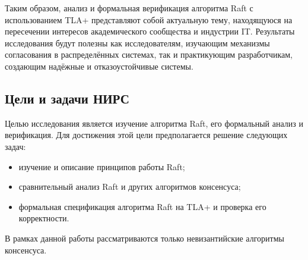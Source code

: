 Таким образом, анализ и формальная верификация алгоритма Raft с использованием
TLA+ представляют собой актуальную тему, находящуюся на пересечении интересов
академического сообщества и индустрии IT. Результаты исследования будут полезны
как исследователям, изучающим механизмы согласования в распределённых системах,
так и практикующим разработчикам, создающим надёжные и отказоустойчивые системы.

\subsection*{Цели и задачи НИРС}

Целью исследования является изучение алгоритма Raft, его формальный
анализ и верификация. Для достижения этой цели предполагается решение
следующих задач:

\begin{itemize}
    \item изучение и описание принципов работы Raft;
    \item сравнительный анализ Raft и других алгоритмов консенсуса;
    \item формальная спецификация алгоритма Raft на TLA+ и проверка его корректности.
\end{itemize}

В рамках данной работы рассматриваются только невизантийские алгоритмы
консенсуса.
